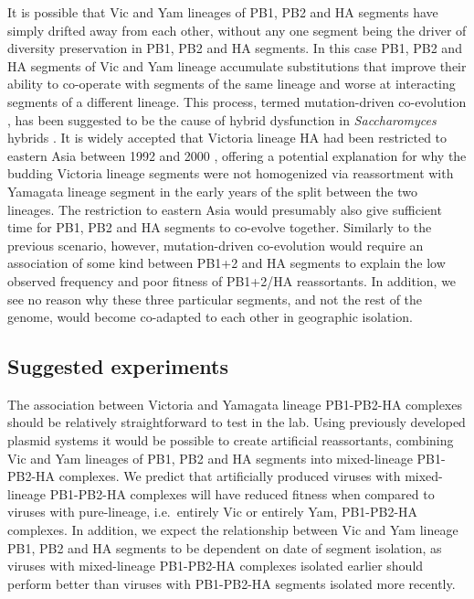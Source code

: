 \documentclass[11pt,oneside,letterpaper]{article}
\begin{document}
It is possible that Vic and Yam lineages of PB1, PB2 and HA segments have simply drifted away from each other, without any one segment being the driver of diversity preservation in PB1, PB2 and HA segments.
In this case PB1, PB2 and HA segments of Vic and Yam lineage accumulate substitutions that improve their ability to co-operate with segments of the same lineage and worse at interacting segments of a different lineage.
This process, termed mutation-driven co-evolution \citep{presgraves2010}, has been suggested to be the cause of hybrid dysfunction in \textit{Saccharomyces} hybrids \citep{lee2008}.
It is widely accepted that Victoria lineage HA had been restricted to eastern Asia between 1992 and 2000 \citep{nerome1998,shaw2002}, offering a potential explanation for why the budding Victoria lineage segments were not homogenized via reassortment with Yamagata lineage segment in the early years of the split between the two lineages. 
The restriction to eastern Asia would presumably also give sufficient time for PB1, PB2 and HA segments to co-evolve together.
Similarly to the previous scenario, however, mutation-driven co-evolution would require an association of some kind between PB1+2 and HA segments to explain the low observed frequency and poor fitness of PB1+2/HA reassortants.
In addition, we see no reason why these three particular segments, and not the rest of the genome, would become co-adapted to each other in geographic isolation.

\subsection*{Suggested experiments}
The association between Victoria and Yamagata lineage PB1-PB2-HA complexes should be relatively straightforward to test in the lab.
Using previously developed plasmid systems \citep{hoffmann2002} it would be possible to create artificial reassortants, combining Vic and Yam lineages of PB1, PB2 and HA segments into mixed-lineage PB1-PB2-HA complexes.
We predict that artificially produced viruses with mixed-lineage PB1-PB2-HA complexes will have reduced fitness when compared to viruses with pure-lineage, i.e.\ entirely Vic or entirely Yam, PB1-PB2-HA complexes.
In addition, we expect the relationship between Vic and Yam lineage PB1, PB2 and HA segments to be dependent on date of segment isolation, as viruses with mixed-lineage PB1-PB2-HA complexes isolated earlier should perform better than viruses with PB1-PB2-HA segments isolated more recently.
\end{document}
